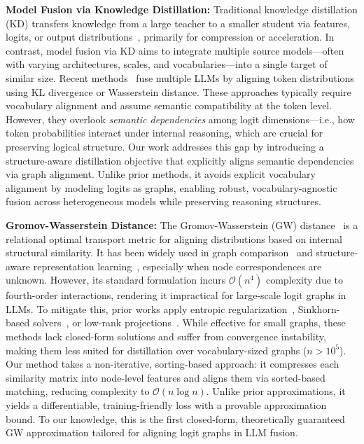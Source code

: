 \documentclass{article}
\begin{document}
\textbf{Model Fusion via Knowledge Distillation:}
Traditional knowledge distillation (KD) transfers knowledge from a large teacher to a smaller student via features, logits, or output distributions~\cite{hinton2015distilling, jiao2020tinybert}, primarily for compression or acceleration. In contrast, model fusion via KD aims to integrate multiple source models—often with varying architectures, scales, and vocabularies—into a single target of similar size. Recent methods~\cite{wanknowledge, yan2025infifusion, shi2024profuser} fuse multiple LLMs by aligning token distributions using KL divergence or Wasserstein distance. These approaches typically require vocabulary alignment and assume semantic compatibility at the token level. However, they overlook \emph{semantic dependencies} among logit dimensions—i.e., how token probabilities interact under internal reasoning, which are crucial for preserving logical structure. Our work addresses this gap by introducing a structure-aware distillation objective that explicitly aligns semantic dependencies via graph alignment. Unlike prior methods, it avoids explicit vocabulary alignment by modeling logits as graphs, enabling robust, vocabulary-agnostic fusion across heterogeneous models while preserving reasoning structures.

\textbf{Gromov-Wasserstein Distance:}
The Gromov-Wasserstein (GW) distance~\cite{memoli2011gromov, peyre2016gromov} is a relational optimal transport metric for aligning distributions based on internal structural similarity. It has been widely used in graph comparison~\cite{xu2019scalable, vayer2020fused} and structure-aware representation learning~\cite{xu2021learning, wang2024interdependency}, especially when node correspondences are unknown. However, its standard formulation incurs $\mathcal{O}(n^4)$ complexity due to fourth-order interactions, rendering it impractical for large-scale logit graphs in LLMs. To mitigate this, prior works apply entropic regularization~\cite{peyre2016gromov, wang2024gradient}, Sinkhorn-based solvers~\cite{xu2019scalable, wang2024towards}, or low-rank projections~\cite{xu2020gromov}. While effective for small graphs, these methods lack closed-form solutions and suffer from convergence instability, making them less suited for distillation over vocabulary-sized graphs ($n > 10^5$). Our method takes a non-iterative, sorting-based approach: it compresses each similarity matrix into node-level features and aligns them via sorted-based matching, reducing complexity to $\mathcal{O}(n \log n)$. Unlike prior approximations, it yields a differentiable, training-friendly loss with a provable approximation bound. To our knowledge, this is the first closed-form, theoretically guaranteed GW approximation tailored for aligning logit graphs in LLM fusion.
\vspace{-2mm}
\end{document}
